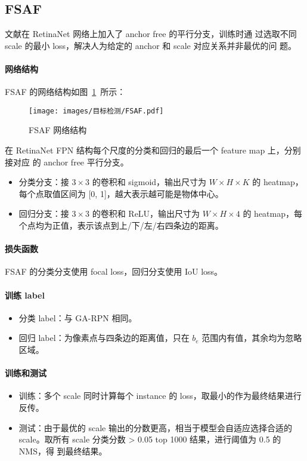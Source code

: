 \subsection{FSAF}
文献在 RetinaNet 网络上加入了 anchor free 的平行分支，训练时通
过选取不同 scale 的最小 loss，解决人为给定的 anchor 和 scale 对应关系并非最优的问
题。

\paragraph{网络结构}
FSAF 的网络结构如图~\ref{fig:FSAF}~所示：

\begin{figure}[ht]
  \centering
  \texttt{[image: images/目标检测/FSAF.pdf]}
  \caption{FSAF 网络结构}
  \label{fig:FSAF}
\end{figure}

在 RetinaNet FPN 结构每个尺度的分类和回归的最后一个 feature map 上，分别接对应
的 anchor free 平行分支。

\begin{itemize}
  \item 分类分支：接 $3 \times 3$ 的卷积和 sigmoid，输出尺寸为 $W \times H \times
    K$ 的 heatmap，每个点取值区间为 [0, 1]，越大表示越可能是物体中心。
  \item 回归分支：接 $3 \times 3$ 的卷积和 ReLU，输出尺寸为 $W \times H \times
    4$ 的 heatmap，每个点均为正值，表示该点到上/下/左/右四条边的距离。
\end{itemize}

\paragraph{损失函数}
FSAF 的分类分支使用 focal loss，回归分支使用 IoU loss。

\paragraph{训练 label}
\begin{itemize}
  \item 分类 label：与 GA-RPN 相同。
  \item 回归 label：为像素点与四条边的距离值，只在 $b_e$ 范围内有值，其余均为忽略区域。
\end{itemize}

\paragraph{训练和测试}
\begin{itemize}
  \item 训练：多个 scale 同时计算每个 instance 的 loss，取最小的作为最终结果进行
    反传。
  \item 测试：由于最优的 scale 输出的分数更高，相当于模型会自适应选择合适的
    scale。取所有 scale 分类分数 > 0.05 top 1000 结果，进行阈值为 0.5 的 NMS，得
    到最终结果。
\end{itemize}

